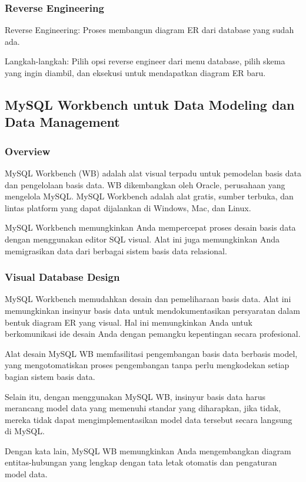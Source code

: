 \documentclass{article}
\begin{document}
\subsubsection{Reverse Engineering}
Reverse Engineering: Proses membangun diagram ER dari database yang sudah ada.

Langkah-langkah: Pilih opsi reverse engineer dari menu database, pilih skema yang ingin diambil, dan eksekusi untuk mendapatkan diagram ER baru.

\subsection{MySQL Workbench untuk Data Modeling dan Data Management}
\subsubsection{Overview}
MySQL Workbench (WB) adalah alat visual terpadu untuk pemodelan basis data dan pengelolaan basis data. WB dikembangkan oleh Oracle, perusahaan yang mengelola MySQL. MySQL Workbench adalah alat gratis, sumber terbuka, dan lintas platform yang dapat dijalankan di Windows, Mac, dan Linux.

MySQL Workbench memungkinkan Anda mempercepat proses desain basis data dengan menggunakan editor SQL visual. Alat ini juga memungkinkan Anda memigrasikan data dari berbagai sistem basis data relasional.

\subsubsection{Visual Database Design}
MySQL Workbench memudahkan desain dan pemeliharaan basis data. Alat ini memungkinkan insinyur basis data untuk mendokumentasikan persyaratan dalam bentuk diagram ER yang visual. Hal ini memungkinkan Anda untuk berkomunikasi ide desain Anda dengan pemangku kepentingan secara profesional.

Alat desain MySQL WB memfasilitasi pengembangan basis data berbasis model, yang mengotomatiskan proses pengembangan tanpa perlu mengkodekan setiap bagian sistem basis data.

Selain itu, dengan menggunakan MySQL WB, insinyur basis data harus merancang model data yang memenuhi standar yang diharapkan, jika tidak, mereka tidak dapat mengimplementasikan model data tersebut secara langsung di MySQL.

Dengan kata lain, MySQL WB memungkinkan Anda mengembangkan diagram entitas-hubungan yang lengkap dengan tata letak otomatis dan pengaturan model data.
\end{document}
